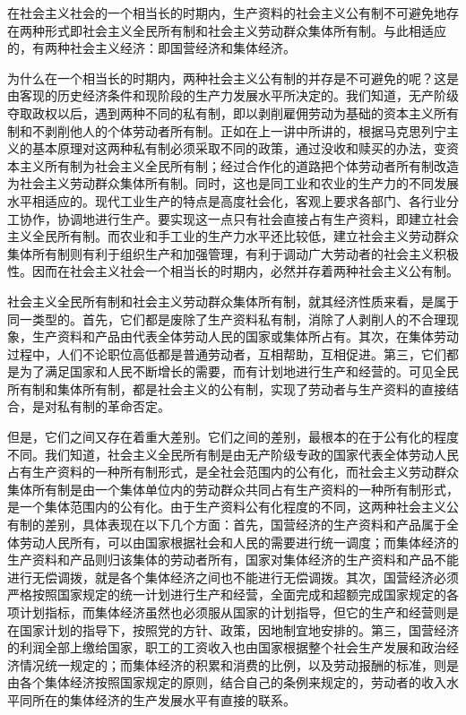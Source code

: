 \documentclass{book}
\begin{document}
在社会主义社会的一个相当长的时期内，生产资料的社会主义公有制不可避免地存在两种形式即社会主义全民所有制和社会主义劳动群众集体所有制。与此相适应的，有两种社会主义经济：即国营经济和集体经济。

为什么在一个相当长的时期内，两种社会主义公有制的并存是不可避免的呢？这是由客现的历史经济条件和现阶段的生产力发展水平所决定的。我们知道，无产阶级夺取政权以后，遇到两种不同的私有制，即以剥削雇佣劳动为基础的资本主义所有制和不剥削他人的个体劳动者所有制。正如在上一讲中所讲的，根据马克思列宁主义的基本原理对这两种私有制必须采取不同的政策，通过没收和赎买的办法，变资本主义所有制为社会主义全民所有制；经过合作化的道路把个体劳动者所有制改造为社会主义劳动群众集体所有制。同时，这也是同工业和农业的生产力的不同发展水平相适应的。现代工业生产的特点是高度社会化，客观上要求各部门、各行业分工协作，协调地进行生产。要实现这一点只有社会直接占有生产资料，即建立社会主义全民所有制。而农业和手工业的生产力水平还比较低，建立社会主义劳动群众集体所有制则有利于组织生产和加强管理，有利于调动广大劳动者的社会主义积极性。因而在社会主义社会一个相当长的时期内，必然并存着两种社会主义公有制。

社会主义全民所有制和社会主义劳动群众集体所有制，就其经济性质来看，是属于同一类型的。首先，它们都是废除了生产资料私有制，消除了人剥削人的不合理现象，生产资料和产品由代表全体劳动人民的国家或集体所占有。其次，在集体劳动过程中，人们不论职位高低都是普通劳动者，互相帮助，互相促进。第三，它们都是为了满足国家和人民不断增长的需要，而有计划地进行生产和经营的。可见全民所有制和集体所有制，都是社会主义的公有制，实现了劳动者与生产资料的直接结合，是对私有制的革命否定。

但是，它们之间又存在着重大差别。它们之间的差别，最根本的在于公有化的程度不同。我们知道，社会主义全民所有制是由无产阶级专政的国家代表全体劳动人民占有生产资料的一种所有制形式，是全社会范围内的公有化，而社会主义劳动群众集体所有制是由一个集体单位内的劳动群众共同占有生产资料的一种所有制形式，是一个集体范围内的公有化。由于生产资料公有化程度的不同，这两种社会主义公有制的差别，具体表现在以下几个方面：首先，国营经济的生产资料和产品属于全体劳动人民所有，可以由国家根据社会和人民的需要进行统一调度；而集体经济的生产资料和产品则归该集体的劳动者所有，国家对集体经济的生产资料和产品不能进行无偿调拨，就是各个集体经济之间也不能进行无偿调拨。其次，国营经济必须严格按照国家规定的统一计划进行生产和经营，全面完成和超额完成国家规定的各项计划指标，而集体经济虽然也必须服从国家的计划指导，但它的生产和经营则是在国家计划的指导下，按照党的方针、政策，因地制宜地安排的。第三，国营经济的利润全部上缴给国家，职工的工资收入也由国家根据整个社会生产发展和政治经济情况统一规定的；而集体经济的积累和消费的比例，以及劳动报酬的标准，则是由各个集体经济按照国家规定的原则，结合自己的条例来规定的，劳动者的收入水平同所在的集体经济的生产发展水平有直接的联系。
\end{document}
